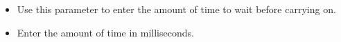\begin{itemize}
\item Use this parameter to enter the amount of time to wait before carrying on.
\item Enter the amount of time in milliseconds. 
\end{itemize}

 